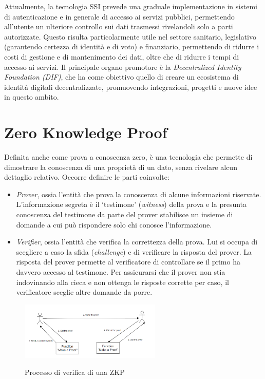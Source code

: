 Attualmente, la tecnologia SSI prevede una graduale implementazione in sistemi di autenticazione e
in generale di accesso ai servizi pubblici, permettendo all'utente un ulteriore controllo
sui dati trasmessi rivelandoli solo a parti autorizzate.
Questo risulta particolarmente utile nel settore sanitario, legislativo (garantendo certezza di identità e di voto) e finanziario,
permettendo di ridurre i costi di gestione e di mantenimento dei dati, oltre che di ridurre i tempi di accesso ai servizi.
Il principale organo promotore è la \textit{Decentralized Identity Foundation (DIF)}, che ha come obiettivo quello di creare
un ecosistema di identità digitali decentralizzate, promuovendo integrazioni, progetti e nuove idee in questo ambito. 

\section{Zero Knowledge Proof}\label{sec:zero-knowledge-proof}
Definita anche come prova a conoscenza zero, è una tecnologia che permette di dimostrare la conoscenza di una proprietà di un dato,
senza rivelare alcun dettaglio relativo.
Occorre definire le parti coinvolte:
\begin{itemize}
    \item \textit{Prover}, ossia l'entità che prova la conoscenza di alcune informazioni riservate. 
    L'informazione segreta è il `testimone' (\textit{witness}) della prova e la presunta conoscenza del testimone da parte del prover stabilisce un insieme di domande a cui può rispondere solo chi conosce l'informazione. 
    \item \textit{Verifier}, ossia l'entità che verifica la correttezza della prova. Lui si occupa di scegliere a caso la sfida (\textit{challenge}) e di verificare la risposta del prover.
    La risposta del prover permette al verificatore di controllare se il primo ha davvero accesso al testimone. 
    Per assicurarsi che il prover non stia indovinando alla cieca e non ottenga le risposte corrette per caso, il verificatore sceglie altre domande da porre.
\end{itemize}

\begin{figure}[h]
    \centering
    \includegraphics[width=0.6\textwidth, alt={Come funziona la verifica nella ZKP}]{immagini/zkp.png}
    \caption{Processo di verifica di una ZKP}
\end{figure}

